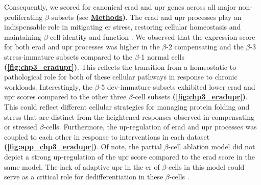 \par Consequently, we scored for canonical \gls{erad} and \gls{upr} genes across all major non-proliferating $\beta$-subsets \textbf{(}see \hyperref[subsubsec:met_chp3_scoring]{\textbf{Methods}}\textbf{)}. The \gls{erad} and \gls{upr} processes play an indispensable role in mitigating \gls{er} stress, restoring cellular homeostasis and maintaining $\beta$-cell identity and function \textbf{\cite{oppenlander_vertical_2021}}. We observed that the expression score for both \gls{erad} and \gls{upr} processes was higher in the $\beta$-2 compensating and the $\beta$-3 stress-immature subsets compared to the $\beta$-1 normal cells \textbf{(\autoref{fig:chp3_eradupr})}. This reflects the transition from a homeostatic to pathological role for both of these cellular pathways in response to chronic workloads. Interestingly, the $\beta$-5 dev-immature subsets exhibited lower \gls{erad} and \gls{upr} scores compared to the other three $\beta$-cell subsets \textbf{(\autoref{fig:chp3_eradupr})}. This could reflect different cellular strategies for managing protein folding and stress that are distinct from the heightened responses observed in compensating or stressed $\beta$-cells. Furthermore, the up-regulation of \gls{erad} and \gls{upr} processes was coupled to each other in response to interventions in each dataset \textbf{(\autoref{fig:app_chp3_eradupr})}. Of note, the partial $\beta$-cell ablation model did not depict a strong up-regulation of the \gls{upr} score compared to the \gls{erad} score in the same model. The lack of adaptive \gls{upr} in the \gls{er} of $\beta$-cells in this model could serve as a critical role for dedifferentiation in these $\beta$-cells \textbf{\cite{sachs_targeted_2020,khin_brief_2021}}.\\








